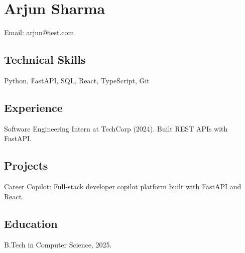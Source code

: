 \documentclass{article}
\begin{document}
\section*{Arjun Sharma}
Email: arjun@test.com
\subsection*{Technical Skills}
Python, FastAPI, SQL, React, TypeScript, Git
\subsection*{Experience}
Software Engineering Intern at TechCorp (2024). Built REST APIs with FastAPI.
\subsection*{Projects}
Career Copilot: Full-stack developer copilot platform built with FastAPI and React.
\subsection*{Education}
B.Tech in Computer Science, 2025.
\end{document}
